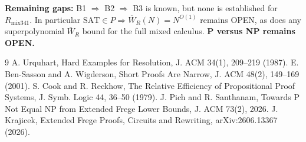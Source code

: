 \documentclass{article}
\begin{document}
\noindent\textbf{Remaining gaps:} B1 $\Rightarrow$ B2 $\Rightarrow$ B3 is known, but none is established for $R_{\mathrm{mix341}}$. In particular $\mathrm{SAT}\in P\Longrightarrow\overline W_R(N)=N^{O(1)}$ remains OPEN, as does any superpolynomial $\overline W_R$ bound for the full mixed calculus. \textbf{P versus NP remains OPEN.}

\begin{thebibliography}{9}
 A. Urquhart, Hard Examples for Resolution, J. ACM 34(1), 209--219 (1987).
 E. Ben-Sasson and A. Wigderson, Short Proofs Are Narrow, J. ACM 48(2), 149--169 (2001).
 S. Cook and R. Reckhow, The Relative Efficiency of Propositional Proof Systems, J. Symb. Logic 44, 36--50 (1979).
 J. Pich and R. Santhanam, Towards P Not Equal NP from Extended Frege Lower Bounds, J. ACM 73(2), 2026.
 J. Krajicek, Extended Frege Proofs, Circuits and Rewriting, arXiv:2606.13367 (2026).
\end{thebibliography}
\end{document}
